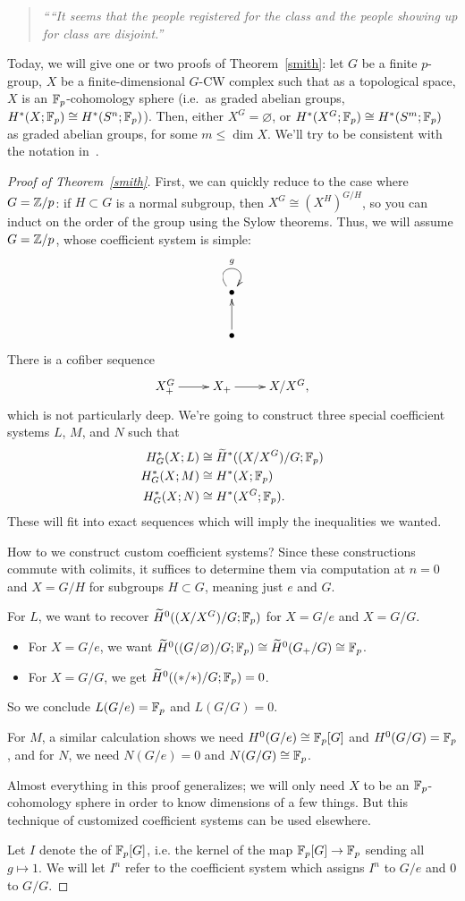 \begin{quote}\textit{
	````It seems that the people registered for the class and the people showing up for class are disjoint.''
}\end{quote}
Today, we will give one or two proofs of Theorem~\ref{smith}: let $G$ be a finite $p$-group, $X$ be a
finite-dimensional $G$-CW complex such that as a topological space, $X$ is an $\mathbb F_p$-cohomology sphere (i.e.\ as
graded abelian groups, $H^*(X;\mathbb F_p)\cong H^*(S^n;\mathbb F_p)$). Then, either $X^G = \varnothing$, or $H^*(X^G;\mathbb F_p)\cong
H^*(S^m;\mathbb F_p)$ as graded abelian groups, for some $m\le\dim X$. We'll try to be consistent with the notation
in~\cite{MaySmithTheory, AlaskaNotes}.
\begin{proof}[Proof of Theorem~\ref{smith}]
First, we can quickly reduce to the case where $G = \mathbb Z/p$: if $H\subset G$ is a normal subgroup, then $X^G\cong
(X^H)^{G/H}$, so you can induct on the order of the group using the Sylow theorems. Thus, we will assume $G =
\mathbb Z/p$, whose coefficient system is simple:
\[\xymatrix{
	\bullet\ar@(ul, ur)^g\\
	\bullet\ar[u]
}\]
There is a cofiber sequence
\[\xymatrix{
	X_+^G\ar[r] & X_+\ar[r] & X/X^G,
}\]
which is not particularly deep. We're going to construct three special coefficient systems $L$, $M$, and $N$ such
that
\begin{align*}
	H_G^*(X;L) &\cong \widetilde H^*((X/X^G)/G; \mathbb F_p)\\
	H_G^*(X;M) &\cong H^*(X;\mathbb F_p)\\
	H_G^*(X;N) &\cong H^*(X^G;\mathbb F_p).
\end{align*}
These will fit into exact sequences which will imply the inequalities we wanted.

How to we construct custom coefficient systems? Since these constructions commute with colimits, it suffices to
determine them via computation at $n = 0$ and $X = G/H$ for subgroups $H\subset G$, meaning just $e$ and $G$.

For $L$, we want to recover $\widetilde H^0((X/X^G)/G;\mathbb F_p)$ for $X = G/e$ and $X = G/G$.
\begin{itemize}
	\item For $X = G/e$, we want $\widetilde H^0((G/\varnothing)/G;\mathbb F_p)\cong \widetilde H^0(G_+/G)\cong\mathbb F_p$.
	\item For $X = G/G$, we get $\widetilde H^0((*/*)/G;\mathbb F_p) = 0$.
\end{itemize}
So we conclude $L(G/e) = \mathbb F_p$ and $L(G/G) = 0$.

For $M$, a similar calculation shows we need $H^0(G/e)\cong\mathbb F_p[G]$ and $H^0(G/G) = \mathbb F_p$, and for $N$, we need
$N(G/e) = 0$ and $N(G/G)\cong\mathbb F_p$.
\begin{rem}
Almost everything in this proof generalizes; we will only need $X$ to be an $\mathbb F_p$-cohomology sphere in order to
know dimensions of a few things. But this technique of customized coefficient systems can be used elsewhere.
\end{rem}
Let $I$ denote the  of $\mathbb F_p[G]$, i.e. the kernel of the map $\mathbb F_p[G]\to\mathbb F_p$ sending all
$g\mapsto 1$. We will let $I^n$ refer to the coefficient system which assigns $I^n$ to $G/e$ and $0$ to $G/G$.


\end{proof}
